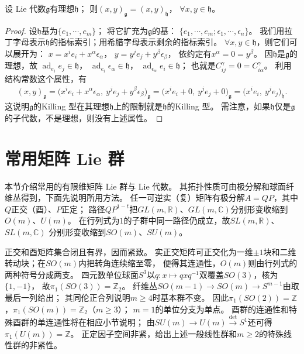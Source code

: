 \begin{proposition}\label{chlg:thm_Killing-gh}
    设 Lie 代数$\mathfrak{g}$有理想$\mathfrak{h}$；
    则$(x,y)_{\mathfrak{g}}=(x,y)_{\mathfrak{h}}$，
    $\forall x,y\in \mathfrak{h} $。
\end{proposition}
\begin{proof}
    设$\mathfrak{h}$基为$\{e_1,\cdots,e_m\}$；
    将它扩充为$\mathfrak{g}$的基：
    $\{e_1,\cdots,e_m;\epsilon_1,\cdots,\epsilon_n\}$。
    我们用拉丁字母表示$\mathfrak{h}$的指标索引；用希腊字母表示剩余的指标索引。
    $\forall x,y \in \mathfrak{h}$，则它们可以展开为：
    $x= x^i e_i + x^\alpha \epsilon_\alpha$，
    $y= y^j e_j + y^\beta \epsilon_\beta$，
    依约定有$x^\alpha=0=y^\beta$。
    因$\mathfrak{h}$是$\mathfrak{g}$的理想，故
    $\operatorname{ad}_{e_i}e_j \in  \mathfrak{h}$，
    $\operatorname{ad}_{e_i}\epsilon_\alpha \in  \mathfrak{h}$，
    $\operatorname{ad}_{\epsilon_\alpha}e_i \in  \mathfrak{h}$；
    也就是$C_{ij}^\gamma=0=C_{i\alpha}^\gamma$。
    利用结构常数这个属性，有
    \begin{align*}
        (x,y)_{\mathfrak{g}}= \bigl(x^i e_i + x^\alpha \epsilon_\alpha,\
        y^j e_j + y^\beta \epsilon_\beta\bigr)_{\mathfrak{g}}
        =\bigl(x^i e_i + 0,\ y^j e_j + 0\bigr)_{\mathfrak{g}}
        =\bigl(x^ie_i ,\ y^je_j \bigr)_{\mathfrak{h}}.
    \end{align*}
    这说明$\mathfrak{g}$的Killing 型在其理想$\mathfrak{h}$上的限制就是$\mathfrak{h}$的Killing 型。
    需注意，如果$\mathfrak{h}$仅是$\mathfrak{g}$的子代数，不是理想，则没有上述属性。
\end{proof}

\section{常用矩阵 Lie 群}
本节介绍常用的有限维矩阵 Lie 群与 Lie 代数。
其拓扑性质可由极分解和球面纤维丛得到，下面先说明所用方法。
任一可逆实（复）矩阵有极分解$A=QP$，其中$Q$正交（酉）、$P$正定；
路径$QP^{1-t}$把$GL(m,\mathbb R)$、$GL(m,\mathbb C)$分别形变收缩到$O(m)$、$U(m)$。
在行列式为$1$的子群中同一路径仍成立，故$SL(m,\mathbb R)$、$SL(m,\mathbb C)$
分别形变收缩到$SO(m)$、$SU(m)$。

正交和酉矩阵集合闭且有界，因而紧致。
实正交矩阵可正交化为一维$\pm1$块和二维转动块；在$SO(m)$内把转角连续缩至零，
便得其连通性，$O(m)$则由行列式的两种符号分成两支。
四元数单位球面$S^3$以$q:x\mapsto qxq^{-1}$双覆盖$SO(3)$，核为$\{1,-1\}$，
故$\pi_1(SO(3))=\mathbb Z_2$。
纤维丛$SO(m-1)\to SO(m)\to S^{m-1}$由取最后一列给出；
其同伦正合列说明$m\geqslant4$时基本群不变。
因此$\pi_1(SO(2))=\mathbb Z$，$\pi_1(SO(m))=\mathbb Z_2$（$m\geqslant3$）；
$m=1$的单位分支为单点。
酉群的连通性和特殊酉群的单连通性将在相应小节说明；
由$SU(m)\to U(m)\xrightarrow{\det}S^1$还可得$\pi_1(U(m))=\mathbb Z$。
正定因子空间非紧，给出上述一般线性群和$m\geqslant2$的特殊线性群的非紧性。

